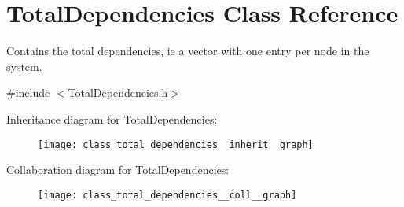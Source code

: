 \hypertarget{class_total_dependencies}{}\section{Total\+Dependencies Class Reference}
\label{class_total_dependencies}


Contains the total dependencies, ie a vector with one entry per node in the system.  




{\ttfamily \#include $<$Total\+Dependencies.\+h$>$}



Inheritance diagram for Total\+Dependencies\+:
\nopagebreak
\begin{figure}[H]
\begin{center}
\leavevmode
\texttt{[image: class\_total\_dependencies\_\_inherit\_\_graph]}
\end{center}
\end{figure}


Collaboration diagram for Total\+Dependencies\+:
\nopagebreak
\begin{figure}[H]
\begin{center}
\leavevmode
\texttt{[image: class\_total\_dependencies\_\_coll\_\_graph]}
\end{center}
\end{figure}
